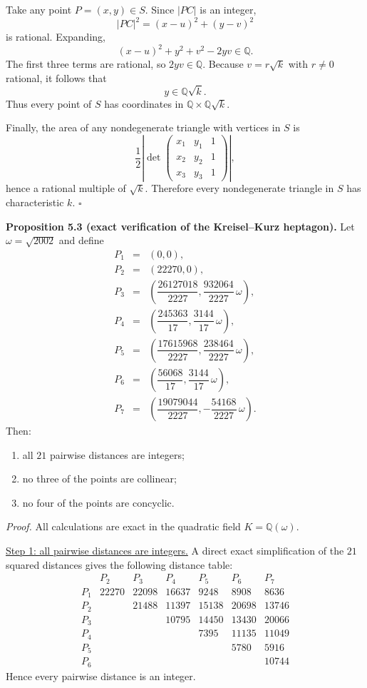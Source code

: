 Take any point $P=(x,y)\in S$. Since $|PC|$ is an integer,
\[
|PC|^2=(x-u)^2+(y-v)^2
\]
is rational. Expanding,
\[
(x-u)^2+y^2+v^2-2yv\in \mathbb{Q}.
\]
The first three terms are rational, so $2yv\in \mathbb{Q}$. Because $v=r\sqrt{k}$ with $r\neq 0$ rational, it follows that
\[
y\in \mathbb{Q}\sqrt{k}.
\]
Thus every point of $S$ has coordinates in $\mathbb{Q}\times \mathbb{Q}\sqrt{k}$.

Finally, the area of any nondegenerate triangle with vertices in $S$ is
\[
\frac12\left| \det\begin{pmatrix}x_1&y_1&1\\x_2&y_2&1\\x_3&y_3&1\end{pmatrix}\right|,
\]
hence a rational multiple of $\sqrt{k}$. Therefore every nondegenerate triangle in $S$ has characteristic $k$.
\hfill$\square$

\medskip
\noindent\textbf{Proposition 5.3 (exact verification of the Kreisel--Kurz heptagon).}
Let $\omega=\sqrt{2002}$ and define
\[
\begin{array}{rcl}
P_1&=&(0,0),\\[2mm]
P_2&=&(22270,0),\\[2mm]
P_3&=&\left(\dfrac{26127018}{2227}, \dfrac{932064}{2227}\,\omega\right),\\[3mm]
P_4&=&\left(\dfrac{245363}{17}, \dfrac{3144}{17}\,\omega\right),\\[3mm]
P_5&=&\left(\dfrac{17615968}{2227}, \dfrac{238464}{2227}\,\omega\right),\\[3mm]
P_6&=&\left(\dfrac{56068}{17}, \dfrac{3144}{17}\,\omega\right),\\[3mm]
P_7&=&\left(\dfrac{19079044}{2227}, -\dfrac{54168}{2227}\,\omega\right).
\end{array}
\]
Then:
\begin{enumerate}
\item all $21$ pairwise distances are integers;
\item no three of the points are collinear;
\item no four of the points are concyclic.
\end{enumerate}

\smallskip
\noindent\emph{Proof.}
All calculations are exact in the quadratic field $K=\mathbb{Q}(\omega)$.

\smallskip
\noindent\underline{Step 1: all pairwise distances are integers.}
A direct exact simplification of the $21$ squared distances gives the following distance table:
\[
\begin{array}{c|cccccc}
 & P_2 & P_3 & P_4 & P_5 & P_6 & P_7\\
\hline
P_1 & 22270 & 22098 & 16637 & 9248 & 8908 & 8636\\
P_2 &       & 21488 & 11397 & 15138 & 20698 & 13746\\
P_3 &       &       & 10795 & 14450 & 13430 & 20066\\
P_4 &       &       &       & 7395  & 11135 & 11049\\
P_5 &       &       &       &       & 5780  & 5916\\
P_6 &       &       &       &       &       & 10744
\end{array}
\]
Hence every pairwise distance is an integer.

